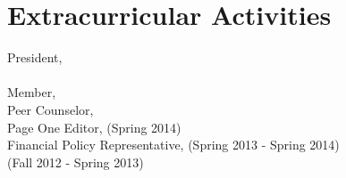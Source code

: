 \documentclass[]{deedy-resume-openfont}
\begin{document}
\begin{minipage}[t]{0.66\textwidth}

\section{Extracurricular Activities} 
President, \\
 \\
Member, \\ 
Peer Counselor,  \\
Page One Editor,  (Spring 2014) \\
Financial Policy Representative,  (Spring 2013 - Spring 2014) \\
 (Fall 2012 - Spring 2013) \\
\sectionsep











\end{minipage} 
\end{document}
